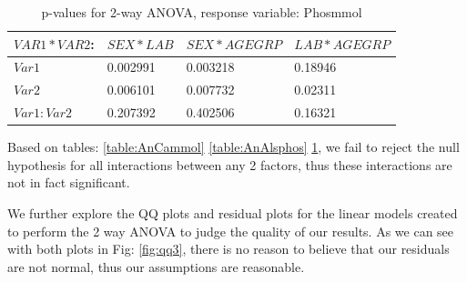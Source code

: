 \documentclass{article}
\begin{document}
    \begin{table}[H]
    \begin{center}
    \scriptsize
    \begin{tabular}{|l|l|l|l|}
      \hline
      $VAR1 * VAR2$:&$SEX * LAB$&$SEX * AGEGRP$&$LAB*AGEGRP$\\
      \hline
      $Var1$       & 0.002991 & 0.003218 & 0.18946\\
      $Var2$       & 0.006101 & 0.007732 & 0.02311\\
      $Var1:Var2$  & 0.207392 & 0.402506 & 0.16321\\
      \hline
    \end{tabular}
    \caption{p-values for 2-way ANOVA, response variable: Phosmmol}
    \label{table:AnPhosmmol}
    \end{center}
    \end{table}
 
Based on tables: \ref{table:AnCammol} \ref{table:AnAlsphos} \ref{table:AnPhosmmol}, we fail to reject the null hypothesis for all interactions between any 2 factors, thus these interactions are not in fact significant.

We further explore the QQ plots and residual plots for the linear models created to perform the 2 way ANOVA to judge the quality of our results. As we can see with both plots in Fig: \ref{fig:qq3}, there is no reason to believe that our residuals are not normal, thus our assumptions are reasonable.
    
\end{document}
